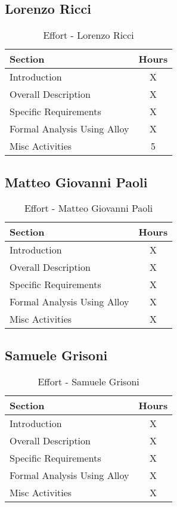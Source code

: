 \subsection*{Lorenzo Ricci}
\begin{table}[H]
    \centering
\begin{tabular}{|l|c|}
        \hline
        \textbf{Section} & \textbf{Hours} \\ \hline
        Introduction & X \\ \hline
        Overall Description & X \\ \hline
        Specific Requirements & X\\ \hline
        Formal Analysis Using Alloy & X \\ \hline
        Misc Activities & 5 \\ \hline
    \end{tabular}
    \caption{Effort - Lorenzo Ricci}
    \label{tab:effotricci}
\end{table}
\subsection*{Matteo Giovanni Paoli}
\begin{table}[H]
    \centering
\begin{tabular}{|l|c|}
        \hline
        \textbf{Section} & \textbf{Hours} \\ \hline
        Introduction & X \\ \hline
        Overall Description & X \\ \hline
        Specific Requirements & X\\ \hline
        Formal Analysis Using Alloy & X \\ \hline
        Misc Activities & X \\ \hline
    \end{tabular}
    \caption{Effort - Matteo Giovanni Paoli}
    \label{tab:effotpaoli}
\end{table}
\subsection*{Samuele Grisoni}
\begin{table}[H]
    \centering
\begin{tabular}{|l|c|}
        \hline
        \textbf{Section} & \textbf{Hours} \\ \hline
        Introduction & X\\ \hline
        Overall Description & X\\ \hline
        Specific Requirements & X\\ \hline
        Formal Analysis Using Alloy & X \\ \hline
        Misc Activities & X\\ \hline
    \end{tabular}
    \caption{Effort - Samuele Grisoni}
    \label{tab:effotgrisoni}
\end{table}